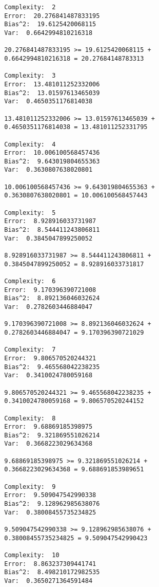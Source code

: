 \begin{verbatim}
        Complexity:  2
        Error:  20.276841487833195
        Bias^2:  19.6125420068115
        Var:  0.6642994810216318
        
        20.276841487833195 >= 19.6125420068115 +
        0.6642994810216318 = 20.27684148783313
        
        Complexity:  3
        Error:  13.481011252332006
        Bias^2:  13.01597613465039
        Var:  0.4650351176814038
        
        13.481011252332006 >= 13.01597613465039 +
        0.4650351176814038 = 13.481011252331795
        
        Complexity:  4
        Error:  10.006100568457436
        Bias^2:  9.643019804655363
        Var:  0.3630807638020801
        
        10.006100568457436 >= 9.643019804655363 +
        0.3630807638020801 = 10.006100568457443
        
        Complexity:  5
        Error:  8.928916033731987
        Bias^2:  8.544411243806811
        Var:  0.3845047899250052
        
        8.928916033731987 >= 8.544411243806811 +
        0.3845047899250052 = 8.928916033731817
        
        Complexity:  6
        Error:  9.170396390721008
        Bias^2:  8.892136046032624
        Var:  0.2782603446884047
        
        9.170396390721008 >= 8.892136046032624 +
        0.2782603446884047 = 9.170396390721029
        
        Complexity:  7
        Error:  9.806570520244321
        Bias^2:  9.465568042238235
        Var:  0.3410024780059168
        
        9.806570520244321 >= 9.465568042238235 +
        0.3410024780059168 = 9.806570520244152
        
        Complexity:  8
        Error:  9.68869185398975
        Bias^2:  9.321869551026214
        Var:  0.3668223029634368
        
        9.68869185398975 >= 9.321869551026214 + 
        0.3668223029634368 = 9.688691853989651
        
        Complexity:  9
        Error:  9.509047542990338
        Bias^2:  9.128962985638076
        Var:  0.38008455735234825
        
        9.509047542990338 >= 9.128962985638076 +
        0.38008455735234825 = 9.509047542990423
        
        Complexity:  10
        Error:  8.863237309441741
        Bias^2:  8.498210172982535
        Var:  0.3650271364591484
        

\end{verbatim}
